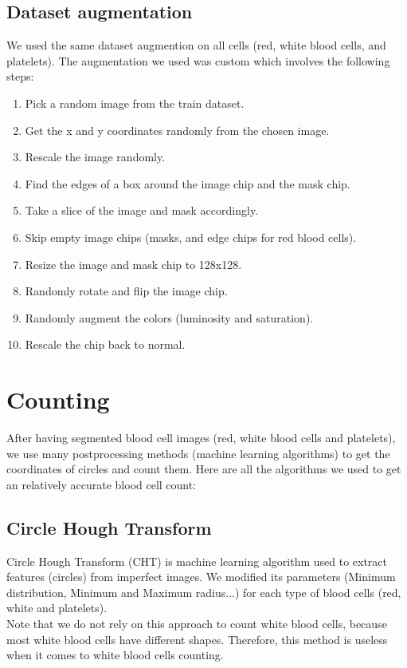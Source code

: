 

\subsection{Dataset augmentation}
We used the same dataset augmention on all cells (red, white blood cells, and platelets).
The augmentation we used was custom which involves the following steps:
\begin{enumerate}
    \item Pick a random image from the train dataset.
    \item Get the x and y coordinates randomly from the chosen image.
    \item Rescale the image randomly.
    \item Find the edges of a box around the image chip and the mask chip.
    \item Take a slice of the image and mask accordingly.
    \item Skip empty image chips (masks, and edge chips for red blood cells).
    \item Resize the image and mask chip to 128x128.
    \item Randomly rotate and flip the image chip.
    \item Randomly augment the colors (luminosity and saturation).
    \item Rescale the chip back to normal.
\end{enumerate}

\section{Counting}
\vspace{0.2in}
\hspace*{0.16in}
After having segmented blood cell images (red, white blood cells and platelets), we use many postprocessing methods (machine learning algorithms) to get the coordinates of circles and count them.
Here are all the algorithms we used to get an relatively accurate blood cell count:

\subsection{Circle Hough Transform}
Circle Hough Transform (CHT) is machine learning algorithm used to extract features (circles) from imperfect images.
We modified its parameters (Minimum distribution, Minimum and Maximum radius...) for each type of blood cells (red, white and platelets).\\
Note that we do not rely on this approach to count white blood cells, because most white blood cells have different shapes.
Therefore, this method is useless when it comes to white blood cells counting.

